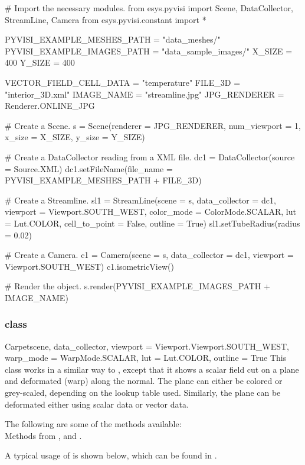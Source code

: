 \begin{python}
# Import the necessary modules.
from esys.pyvisi import Scene, DataCollector, StreamLine, Camera 
from esys.pyvisi.constant import *

PYVISI_EXAMPLE_MESHES_PATH = "data_meshes/"
PYVISI_EXAMPLE_IMAGES_PATH = "data_sample_images/"
X_SIZE = 400
Y_SIZE = 400

VECTOR_FIELD_CELL_DATA = "temperature"
FILE_3D = "interior_3D.xml"
IMAGE_NAME = "streamline.jpg"
JPG_RENDERER = Renderer.ONLINE_JPG


# Create a Scene.
s = Scene(renderer = JPG_RENDERER, num_viewport = 1, x_size = X_SIZE, 
        y_size = Y_SIZE)

# Create a DataCollector reading from a XML file.
dc1 = DataCollector(source = Source.XML)
dc1.setFileName(file_name = PYVISI_EXAMPLE_MESHES_PATH + FILE_3D)

# Create a Streamline.
sl1 = StreamLine(scene = s, data_collector = dc1,
        viewport = Viewport.SOUTH_WEST, color_mode = ColorMode.SCALAR, 
        lut = Lut.COLOR, cell_to_point = False, outline = True)
sl1.setTubeRadius(radius = 0.02)

# Create a Camera.
c1 = Camera(scene = s, data_collector = dc1, viewport = Viewport.SOUTH_WEST)
c1.isometricView()

# Render the object.
s.render(PYVISI_EXAMPLE_IMAGES_PATH + IMAGE_NAME)
\end{python}

\subsubsection{\Carpet class}

\begin{classdesc}{Carpet}{scene, data_collector,
viewport = Viewport.Viewport.SOUTH_WEST, warp_mode = WarpMode.SCALAR, 
lut = Lut.COLOR, outline = True}
This class works in a similar way to \MapOnPlaneCut, except that it shows a 
scalar field cut on a plane and deformated (warp) along the normal. The 
plane can either be colored or grey-scaled, depending on the lookup table used. 
Similarly, the plane can be deformated either using scalar data or vector data.
\end{classdesc}

The following are some of the methods available:\\
Methods from \ActorThreeD, \Warp and \Transform.

A typical usage of \Carpet is shown below, which can be found in 
\texttt{\PyvisiExampleDirectory}.

